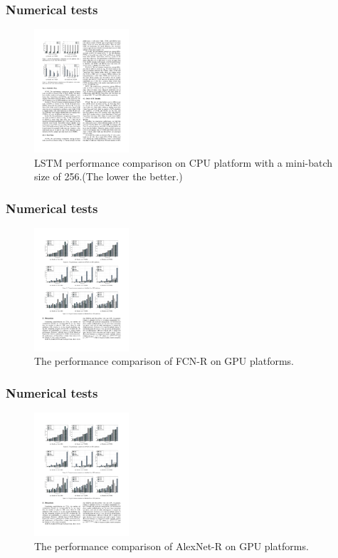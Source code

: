 \begin{frame}
	\MyLogo
	\frametitle{Numerical tests}  
	\begin{figure}[htbp] 
		\includegraphics[height=1.8in]{figures/LSTM1.pdf} 
		\caption{LSTM performance comparison on CPU platform with a mini-batch size of 256.(The lower the better.)}
	\end{figure}
\end{frame}

%

\begin{frame}
	\MyLogo
	\frametitle{Numerical tests}  
	\begin{figure}[htbp] 
		\includegraphics[height=1.8in]{figures/FCN-R2.pdf} 
		\caption{The performance comparison of FCN-R on GPU platforms.}
	\end{figure}
\end{frame}

%

\begin{frame}
	\MyLogo
	\frametitle{Numerical tests}  
	\begin{figure}[htbp] 
		\includegraphics[height=1.8in]{figures/AlexNet-R2.pdf} 
		\caption{The performance comparison of AlexNet-R on GPU platforms.}
	\end{figure}
\end{frame}

